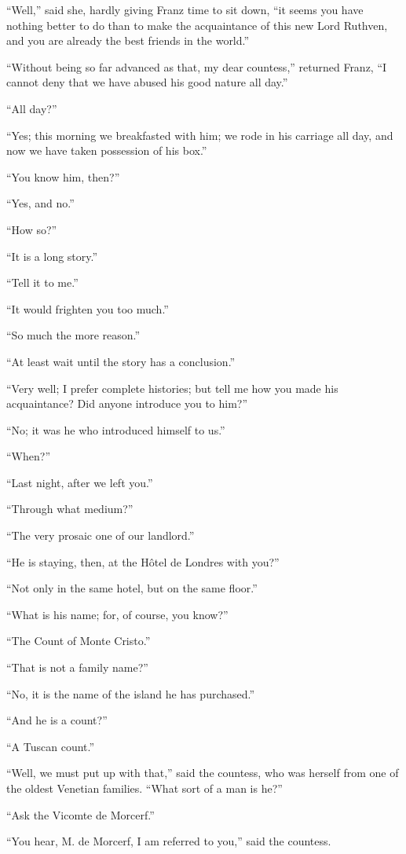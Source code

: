 “Well,” said she, hardly giving Franz time to sit down, “it seems you
have nothing better to do than to make the acquaintance of this new
Lord Ruthven, and you are already the best friends in the world.”

“Without being so far advanced as that, my dear countess,” returned
Franz, “I cannot deny that we have abused his good nature all day.”

“All day?”

“Yes; this morning we breakfasted with him; we rode in his carriage all
day, and now we have taken possession of his box.”

“You know him, then?”

“Yes, and no.”

“How so?”

“It is a long story.”

“Tell it to me.”

“It would frighten you too much.”

“So much the more reason.”

“At least wait until the story has a conclusion.”

“Very well; I prefer complete histories; but tell me how you made his
acquaintance? Did anyone introduce you to him?”

“No; it was he who introduced himself to us.”

“When?”

“Last night, after we left you.”

“Through what medium?”

“The very prosaic one of our landlord.”

“He is staying, then, at the Hôtel de Londres with you?”

“Not only in the same hotel, but on the same floor.”

“What is his name; for, of course, you know?”

“The Count of Monte Cristo.”

“That is not a family name?”

“No, it is the name of the island he has purchased.”

“And he is a count?”

“A Tuscan count.”

“Well, we must put up with that,” said the countess, who was herself
from one of the oldest Venetian families. “What sort of a man is he?”

“Ask the Vicomte de Morcerf.”

“You hear, M. de Morcerf, I am referred to you,” said the countess.

